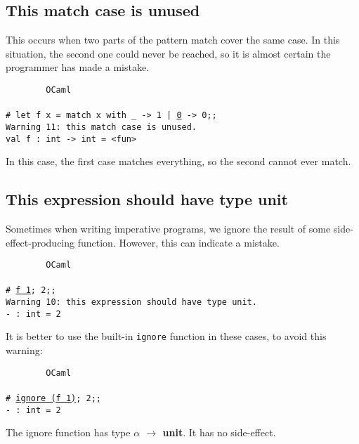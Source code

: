 \documentclass[]{book}
\newcommand{\smspace}{\vspace{4mm}}
\begin{document}
\subsection*{This match case is unused}

This occurs when two parts of the pattern match cover the same case. In this situation, the second one could never be reached, so it is almost certain the programmer has made a mistake.

\smspace
\noindent\verb!        OCaml!\\
\noindent\\
\texttt{\# let f x = match x with \_ -> 1 | \underline{0} -> 0;;}\\
\texttt{Warning 11:\ this match case is unused.}\\
\texttt{val f :\ int -> int = <fun>}
\smspace

\noindent In this case, the first case matches everything, so the second cannot ever match.

\subsection*{This expression should have type unit}

Sometimes when writing imperative programs, we ignore the result of some side-effect-producing function. However, this can indicate a mistake.

\smspace
\noindent\verb!        OCaml!\\
\noindent\\
\texttt{\# \underline{f 1}; 2;;}\\                         
\texttt{Warning 10:\ this expression should have type unit.}\\
\texttt{- :\ int = 2}
\smspace

\noindent It is better to use the built-in \texttt{ignore} function in these cases, to avoid this warning:

\smspace
\noindent\verb!        OCaml!\\
\noindent\\
\texttt{\# \underline{ignore (f 1)}; 2;;}\\                         
\texttt{- :\ int = 2}
\smspace

\noindent The ignore function has type \textsf{\textbf{$\alpha$ $\rightarrow$ unit}}. It has no side-effect.

\lhead{}%
\printindex
\end{document}
